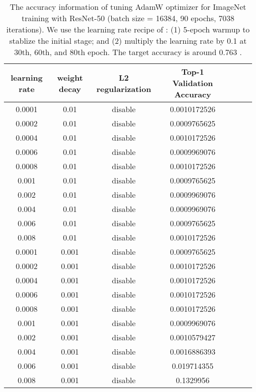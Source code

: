 \documentclass{article} \usepackage{iclr2020_conference,times}
\begin{document}
\begin{table}[ht]
\renewcommand{\arraystretch}{1.3}
\caption{The accuracy information of tuning AdamW optimizer for ImageNet training with ResNet-50 (batch size = 16384, 90 epochs, 7038 iterations). We use the learning rate recipe of \citep{goyal2017accurate}: (1) 5-epoch warmup to stablize the initial stage; and (2) multiply the learning rate by 0.1 at 30th, 60th, and 80th epoch. The target accuracy is around 0.763 \citep{goyal2017accurate}.}
\centering
\begin{tabular}{|c|c|c|c|c|c|c|}
\hline
learning rate & weight decay & L2 regularization & Top-1 Validation Accuracy \\
\hline
\hline
0.0001 & 0.01 & disable & 0.0010172526 \\
\hline
0.0002 & 0.01 & disable & 0.0009765625 \\
\hline
0.0004 & 0.01 & disable & 0.0010172526 \\
\hline
0.0006 & 0.01 & disable & 0.0009969076 \\
\hline
0.0008 & 0.01 & disable & 0.0010172526 \\
\hline
0.001 & 0.01 & disable & 0.0009765625 \\
\hline
0.002 & 0.01 & disable & 0.0009969076 \\
\hline
0.004 & 0.01 & disable & 0.0009969076 \\
\hline
0.006 & 0.01 & disable & 0.0009765625 \\
\hline
0.008 & 0.01 & disable & 0.0010172526 \\
\hline
0.0001 & 0.001 & disable & 0.0009765625 \\
\hline
0.0002 & 0.001 & disable & 0.0010172526 \\
\hline
0.0004 & 0.001 & disable & 0.0010172526 \\
\hline
0.0006 & 0.001 & disable & 0.0010172526 \\
\hline
0.0008 & 0.001 & disable & 0.0010172526 \\
\hline
0.001 & 0.001 & disable & 0.0009969076 \\
\hline
0.002 & 0.001 & disable & 0.0010579427 \\
\hline
0.004 & 0.001 & disable & 0.0016886393 \\
\hline
0.006 & 0.001 & disable & 0.019714355 \\
\hline
0.008 & 0.001 & disable & 0.1329956 \\
\hline
\end{tabular}
\label{table:imagenet_adam_tuning_nol2_1}
\end{table}
\end{document}
